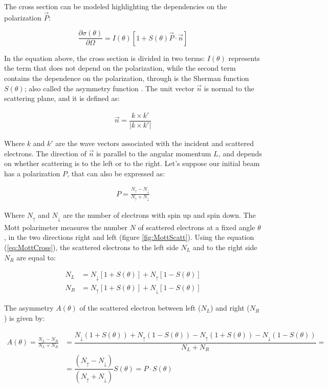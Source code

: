 The cross section can be modeled highlighting the dependencies on the polarization $\vec{P}$:

\begin{equation} \label{eq:MottCross}
\dfrac{\partial\sigma(\theta)}{\partial \Omega} = I(\theta) [1 + S(\theta) \vec{P} \cdot \vec{n} ]
\end{equation}

In the equation above, the cross section is divided in two terms: $I(\theta)$ represents the term that does not depend on the polarization, while the second term contains the dependence on the polarization, through is the Sherman function $S(\theta)$; also called the asymmetry function \cite{MottElectron}. The unit vector $\vec{n}$ is normal to the scattering plane, and it is defined as:

\begin{align*}
\vec{n} = \dfrac{k \times k'}{|k \times k'|}
\end{align*}

Where $k$ and $k'$ are the wave vectors associated with the incident and scattered electrons. The direction of $\vec{n}$ is parallel to the angular momentum $L$, and depends on whether scattering is to the left or to the right.
Let's suppose our initial beam has a polarization $P$, that can also be expressed as:

\begin{align*}
P = \frac{N_{\uparrow} - N_{\downarrow}}{N_{\uparrow} + N_{\downarrow}}
\end{align*}

Where $N_{\uparrow}$ and $N_{\downarrow}$ are the number of electrons with spin up and spin down. The Mott polarimeter measures the number $N$ of scattered electrons at a fixed angle $\theta$, in the two directions right and left (figure \ref{fig:MottScatt}). Using the equation (\ref{eq:MottCross}), the scattered electrons to the left side $N_{L}$ and to the right side $N_{R}$ are equal to: 

\begin{align*}
N_{L} &= N_{\downarrow}[1 + S(\theta)] + N_{\uparrow}[1 - S(\theta)] \\
N_{R} &= N_{\uparrow}[1 + S(\theta)] + N_{\downarrow}[1 - S(\theta)]
\end{align*}

The asymmetry $A(\theta)$ of the scattered electron between left ($N_{L}$) and right ($N_{R}$) is given by:

\begin{align*}
A(\theta) = \frac{N_{L} - N_{R}}{N_{L} + N_{R}} &= \dfrac{N_{\downarrow}(1 + S(\theta)) + N_{\uparrow}(1 - S(\theta)) - N_{\uparrow}(1 + S(\theta)) - N_{\downarrow}(1 - S(\theta))}{N_{L} + N_{R}} = \\ 
&= \dfrac{(N_{\uparrow} - N_{\downarrow})}{(N_{\uparrow} + N_{\downarrow})}S(\theta) =  P \cdot S(\theta)
\end{align*}

